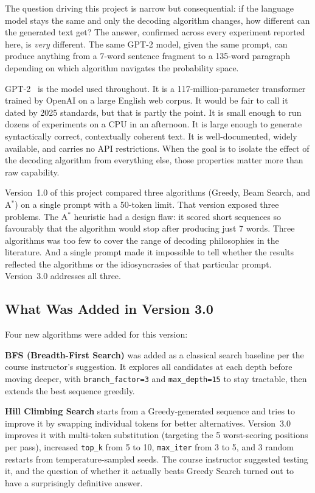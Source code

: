 \documentclass[12pt]{article}
\begin{document}
	The question driving this project is narrow but consequential: if the language model stays the same and only the decoding algorithm changes, how different can the generated text get? The answer, confirmed across every experiment reported here, is \emph{very} different. The same GPT-2 model, given the same prompt, can produce anything from a 7-word sentence fragment to a 135-word paragraph depending on which algorithm navigates the probability space.
	
	GPT-2~\cite{radford2019gpt2} is the model used throughout. It is a 117-million-parameter transformer trained by OpenAI on a large English web corpus. It would be fair to call it dated by 2025 standards, but that is partly the point. It is small enough to run dozens of experiments on a CPU in an afternoon. It is large enough to generate syntactically correct, contextually coherent text. It is well-documented, widely available, and carries no API restrictions. When the goal is to isolate the effect of the decoding algorithm from everything else, those properties matter more than raw capability.
	
	Version~1.0 of this project compared three algorithms (Greedy, Beam Search, and A$^*$) on a single prompt with a 50-token limit. That version exposed three problems. The A$^*$ heuristic had a design flaw: it scored short sequences so favourably that the algorithm would stop after producing just 7 words. Three algorithms was too few to cover the range of decoding philosophies in the literature. And a single prompt made it impossible to tell whether the results reflected the algorithms or the idiosyncrasies of that particular prompt. Version~3.0 addresses all three.
	
	\subsection{What Was Added in Version 3.0}
	
	Four new algorithms were added for this version:
	
	\textbf{BFS (Breadth-First Search)} was added as a classical search baseline per the course instructor's suggestion. It explores all candidates at each depth before moving deeper, with \texttt{branch\_factor=3} and \texttt{max\_depth=15} to stay tractable, then extends the best sequence greedily.
	
	\textbf{Hill Climbing Search} starts from a Greedy-generated sequence and tries to improve it by swapping individual tokens for better alternatives. Version~3.0 improves it with multi-token substitution (targeting the 5 worst-scoring positions per pass), increased \texttt{top\_k} from 5 to 10, \texttt{max\_iter} from 3 to 5, and 3 random restarts from temperature-sampled seeds. The course instructor suggested testing it, and the question of whether it actually beats Greedy Search turned out to have a surprisingly definitive answer.
	
\end{document}
